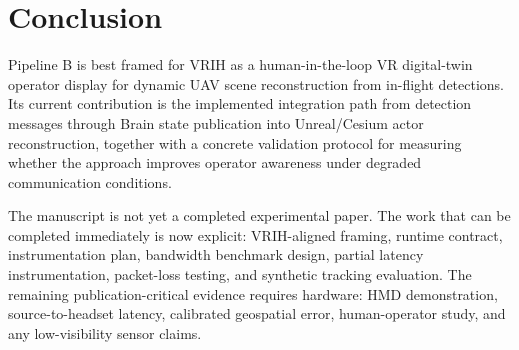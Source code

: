 \documentclass[11pt,a4paper]{article}
\begin{document}
\section{Conclusion}

Pipeline B is best framed for VRIH as a human-in-the-loop VR digital-twin operator display for dynamic UAV scene reconstruction from in-flight detections. Its current contribution is the implemented integration path from detection messages through Brain state publication into Unreal/Cesium actor reconstruction, together with a concrete validation protocol for measuring whether the approach improves operator awareness under degraded communication conditions.

The manuscript is not yet a completed experimental paper. The work that can be completed immediately is now explicit: VRIH-aligned framing, runtime contract, instrumentation plan, bandwidth benchmark design, partial latency instrumentation, packet-loss testing, and synthetic tracking evaluation. The remaining publication-critical evidence requires hardware: HMD demonstration, source-to-headset latency, calibrated geospatial error, human-operator study, and any low-visibility sensor claims.
\end{document}
